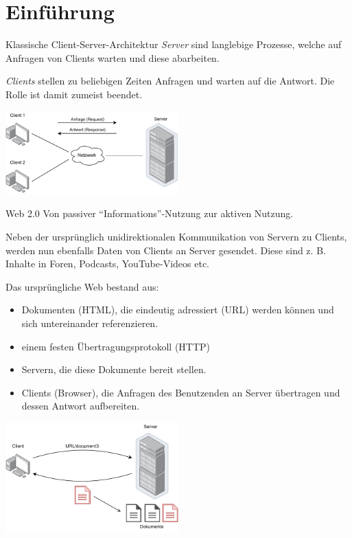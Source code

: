 \section{Einführung}

\begin{defi}{Klassische Client-Server-Architektur}
    \emph{Server} sind langlebige Prozesse, welche auf Anfragen von Clients warten und diese abarbeiten.
    
    \emph{Clients} stellen zu beliebigen Zeiten Anfragen und warten auf die Antwort.
    Die Rolle ist damit zumeist beendet.
    
    \begin{center}
        \includegraphics[width=0.5\textwidth]{includes/figures/defi_client_server.pdf}
    \end{center}
\end{defi}

\begin{bonus}{Web 2.0}
    Von passiver \enquote{Informations}-Nutzung zur aktiven Nutzung.
    
    Neben der ursprünglich unidirektionalen Kommunikation von Servern zu Clients, werden nun ebenfalls Daten von Clients an Server gesendet.
    Diese sind z. B. Inhalte in Foren, Podcasts, YouTube-Videos etc.
    
    Das ursprüngliche Web bestand aus:
    \begin{itemize}
        \item Dokumenten (HTML), die eindeutig adressiert (URL) werden können und sich untereinander referenzieren.
        \item einem festen Übertragungsprotokoll (HTTP)
        \item Servern, die diese Dokumente bereit stellen.
        \item Clients (Browser), die Anfragen des Benutzenden an Server übertragen und dessen Antwort aufbereiten.
    \end{itemize}
    
    \begin{center}
        \includegraphics[width=0.5\textwidth]{includes/figures/bonus_original_web.pdf}
    \end{center}
\end{bonus}

